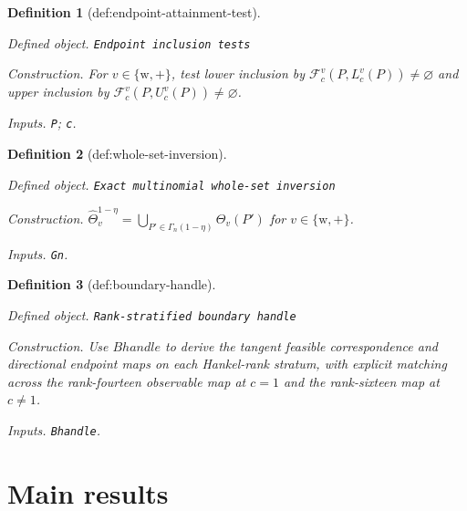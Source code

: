 \documentclass{article}
\newtheorem{definition}{Definition}
\begin{document}
\begin{definition}[def:endpoint-attainment-test]\label{def:endpoint-attainment-test}
\par\smallskip\noindent\emph{Defined object.} \texttt{Endpoint inclusion tests}
\par\smallskip\noindent\emph{Construction.} For \(v\in\{\mathrm w,+\}\), test lower inclusion by \(\mathcal F_c^v(P,L_c^v(P))\neq\varnothing\) and upper inclusion by \(\mathcal F_c^v(P,U_c^v(P))\neq\varnothing\).
\par\smallskip\noindent\emph{Inputs.} \texttt{P}; \texttt{c}.
\end{definition}

\begin{definition}[def:whole-set-inversion]\label{def:whole-set-inversion}
\par\smallskip\noindent\emph{Defined object.} \texttt{Exact multinomial whole-\allowbreak{}set inversion}
\par\smallskip\noindent\emph{Construction.} \(\widehat\Theta_v^{1-\eta}=\bigcup_{P'\in\Gamma_n(1-\eta)}\Theta_v(P')\) for \(v\in\{\mathrm w,+\}\).
\par\smallskip\noindent\emph{Inputs.} \texttt{Gn}.
\end{definition}

\begin{definition}[def:boundary-handle]\label{def:boundary-handle}
\par\smallskip\noindent\emph{Defined object.} \texttt{Rank-\allowbreak{}stratified boundary handle}
\par\smallskip\noindent\emph{Construction.} Use \(Bhandle\) to derive the tangent feasible correspondence and directional endpoint maps on each Hankel-rank stratum, with explicit matching across the rank-fourteen observable map at \(c=1\) and the rank-sixteen map at \(c\ne1\).
\par\smallskip\noindent\emph{Inputs.} \texttt{Bhandle}.
\end{definition}

\section{Main results}
\end{document}
